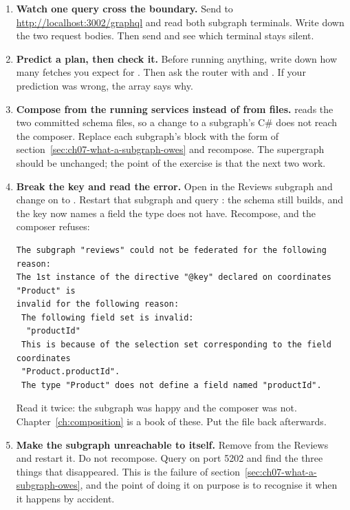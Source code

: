 \begin{enumerate}
  \item \textbf{Watch one query cross the boundary.} Send
   to
  \url{http://localhost:3002/graphql} and read both subgraph terminals. Write
  down the two request bodies. Then send
   and see which terminal stays silent.

  \item \textbf{Predict a plan, then check it.} Before running anything, write
  down how many fetches you expect for
  . Then ask the router with
   and . If
  your prediction was wrong, the  array says why.

  \item \textbf{Compose from the running services instead of from files.}
   reads the two committed schema files, so a change to a
  subgraph's C\# does not reach the composer. Replace each subgraph's
   block with the  form of
  section~\ref{sec:ch07-what-a-subgraph-owes} and recompose. The supergraph
  should be unchanged; the point of the exercise is that the next two work.

  \item \textbf{Break the key and read the error.} Open  in the
  Reviews subgraph and change \code{[Key("id")]} on  to
  . Restart that subgraph and query :
  the schema still builds, and the key now names a field the type does not have.
  Recompose, and the composer refuses:

  \begin{verbatim}
The subgraph "reviews" could not be federated for the following reason:
The 1st instance of the directive "@key" declared on coordinates "Product" is
invalid for the following reason:
 The following field set is invalid:
  "productId"
 This is because of the selection set corresponding to the field coordinates
 "Product.productId".
 The type "Product" does not define a field named "productId".
  \end{verbatim}

  Read it twice: the subgraph was happy and the composer was not.
  Chapter~\ref{ch:composition} is a book of these. Put the file back afterwards.

  \item \textbf{Make the subgraph unreachable to itself.} Remove
   from the Reviews  and restart it.
  Do not recompose. Query  on port 5202 and find the three things
  that disappeared. This is the failure of
  section~\ref{sec:ch07-what-a-subgraph-owes}, and the point of doing it on
  purpose is to recognise it when it happens by accident.


\end{enumerate}
